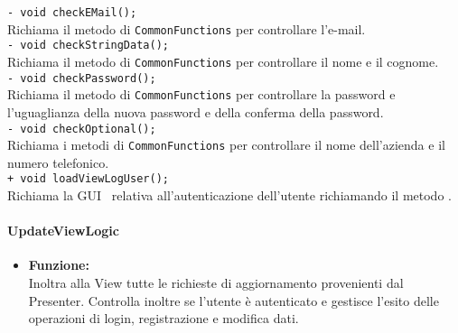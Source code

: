 {{\begin{sloppypar}
{{{\begin{itemize}
					\texttt{- void checkEMail();}\\
					Richiama il metodo di \texttt{CommonFunctions} per controllare l'e-mail.\\

					\texttt{- void checkStringData();}\\
					Richiama il metodo di \texttt{CommonFunctions} per controllare il nome e il cognome.\\

					\texttt{- void checkPassword();}\\
					Richiama il metodo di \texttt{CommonFunctions} per controllare la password e l'uguaglianza della nuova password e della conferma della password.\\

					\texttt{- void checkOptional();}\\
					Richiama i metodi di \texttt{CommonFunctions} per controllare il nome dell'azienda e il numero telefonico.\\
					
					\texttt{+ void loadViewLogUser();}\\
					Richiama la GUI\g~ relativa all'autenticazione dell'utente richiamando il metodo .\\
			\end{itemize}
			}

		

			\paragraph{UpdateViewLogic}\label{par:UpdateViewLogic}{
			\begin{itemize}
			
				\item[] \textbf{Funzione:}\\
					Inoltra alla View tutte le richieste di aggiornamento provenienti dal Presenter. Controlla inoltre se l'utente è autenticato e gestisce l'esito delle operazioni di login, registrazione e modifica dati.\\
			

\end{itemize}}}}
\end{sloppypar}}}

